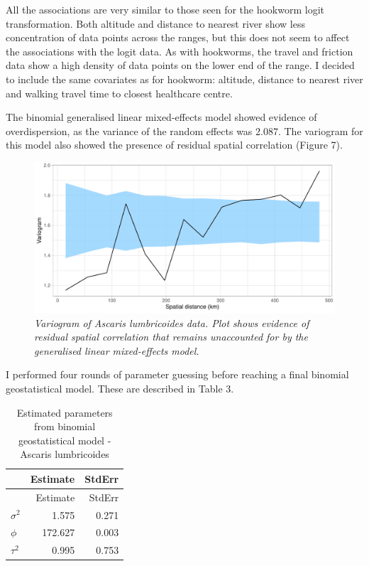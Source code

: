 \documentclass[
]{article}
\begin{document}
All the associations are very similar to those seen for the hookworm
logit transformation. Both altitude and distance to nearest river show
less concentration of data points across the ranges, but this does not
seem to affect the associations with the logit data. As with hookworms,
the travel and friction data show a high density of data points on the
lower end of the range. I decided to include the same covariates as for
hookworm: altitude, distance to nearest river and walking travel time to
closest healthcare centre.

The binomial generalised linear mixed-effects model showed evidence of
overdispersion, as the variance of the random effects was 2.087. The
variogram for this model also showed the presence of residual spatial
correlation (Figure 7).

\begin{figure}
\centering
\includegraphics{write_up_files/figure-latex/Asc.variogram_2-1.pdf}
\caption{\textit{Variogram of Ascaris lumbricoides data. Plot shows evidence of residual spatial correlation that remains unaccounted for by the generalised linear mixed-effects model.}}
\end{figure}

I performed four rounds of parameter guessing before reaching a final
binomial geostatistical model. These are described in Table 3.

\begin{longtable}[]{@{}lrr@{}}
\caption{Estimated parameters from binomial geostatistical model -
Ascaris lumbricoides}\tabularnewline
\toprule
& Estimate & StdErr \\
\midrule
\endfirsthead
\toprule
& Estimate & StdErr \\
\midrule
\endhead
\(\sigma^2\) & 1.575 & 0.271 \\
\(\phi\) & 172.627 & 0.003 \\
\(\tau^2\) & 0.995 & 0.753 \\
\bottomrule
\end{longtable}
\end{document}
